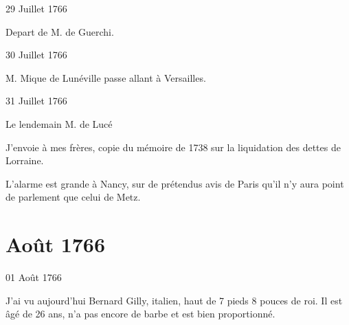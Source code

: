                      \begin{diary}{29 Juillet 1766}{}

                         Depart de M. de
                              Guerchi. \bigskip


                     \end{diary}

                     \begin{diary}{30 Juillet 1766}{}


                           M. Mique de Lunéville passe allant à
                           Versailles. \bigskip


                     \end{diary}

                     \begin{diary}{31 Juillet 1766}{}

                         Le lendemain M. de
                              Lucé
                        \bigskip


                         J'envoie à mes
                              frères, copie du mémoire
                              de 1738 sur la liquidation des dettes de
                              Lorraine. \bigskip


                         L'alarme est grande à Nancy, sur de
                           prétendus avis de Paris qu'il
                           n'y aura
                           point de parlement que celui de
                              Metz. \bigskip


                     \end{diary}
                  \chapter*{Août 1766}



                     \begin{diary}{01 Août 1766}{}

                         J'ai vu aujourd'hui Bernard Gilly, italien,
                           haut de 7 pieds 8 pouces de roi. Il est âgé de
                           26 ans, n'a pas encore de barbe et est bien
                           proportionné. \bigskip


                     \end{diary}

